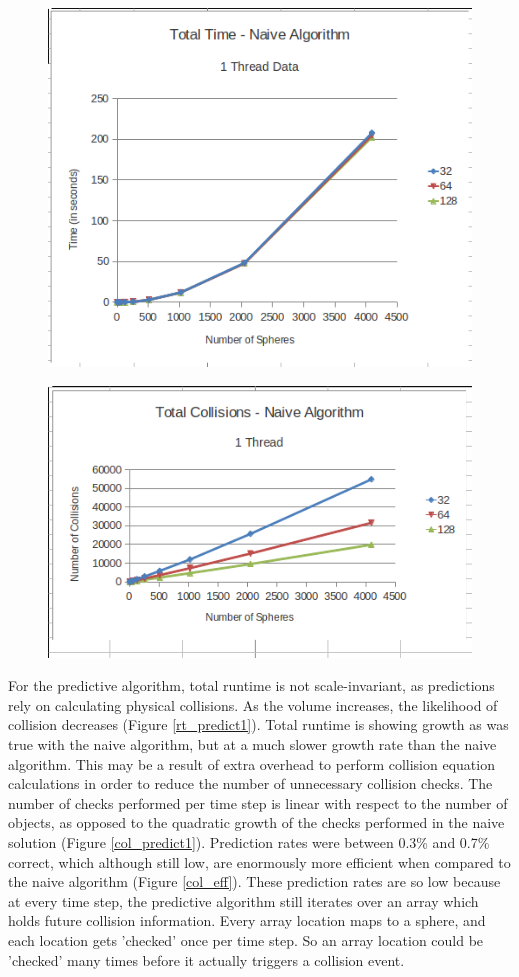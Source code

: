 \documentclass[CEJCS,PDF]{cej} %
\begin{document}
\begin{center}
\begin{figure}
	\includegraphics[width=.45\textwidth]{runtime_naive_1thread.png}
	\label{rt_naive1}
\end{figure}
\end{center}

\begin{center}
\begin{figure}
	\includegraphics[width=.45\textwidth]{collisions_naive_1thread.png}
	\label{col_naive1}
\end{figure}
\end{center}

For the predictive algorithm, total runtime is not scale-invariant, as predictions rely on calculating physical collisions.  As the volume increases, the likelihood of collision decreases (Figure \ref{rt_predict1}).  Total runtime is showing growth as was true with the naive algorithm, but at a much slower growth rate than the naive algorithm.  This may be a result of extra overhead to perform collision equation calculations in order to reduce the number of unnecessary collision checks.  The number of checks performed per time step is linear with respect to the number of objects, as opposed to the quadratic growth of the checks performed in the naive solution (Figure \ref{col_predict1}).  Prediction rates were between 0.3\% and 0.7\% correct, which although still low, are enormously more efficient when compared to the naive algorithm (Figure \ref{col_eff}).  These prediction rates are so low because at every time step, the predictive algorithm still iterates over an array which holds future collision information.  Every array location maps to a sphere, and each location gets 'checked' once per time step.  So an array location could be 'checked' many times before it actually triggers a collision event.
\end{document}
